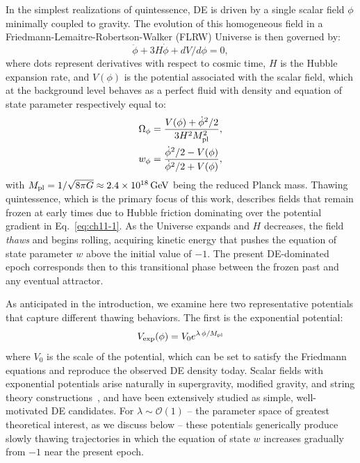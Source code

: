 \noindent In the simplest realizations of quintessence, DE is driven by a single scalar field $\phi$  minimally
coupled to gravity. The evolution of this homogeneous field in a Friedmann-Lemaitre-Robertson-Walker (FLRW) Universe is then governed by:
\begin{equation}
    \ddot{\phi} + 3H\dot{\phi} +
dV/d\phi
= 0, \label{eq:ch11-1}
\end{equation}
where dots represent derivatives with respect to cosmic time, $H$ is the Hubble expansion rate, and $V(\phi)$ is the potential associated with the scalar field, which at the background level behaves as a perfect fluid with density and equation of state parameter respectively equal to:
\begin{align}
    &\Omega_\phi=\frac{V(\phi)+\dot{\phi}^2/2}{3 H^2 M_{\mathrm{pl}}^2},
    \\
    &w_\phi=\frac{\dot{\phi}^2/2-V(\phi)}{\dot{\phi}^2/2+V(\phi)},
\end{align}
with $M_{\mathrm{pl}}=1/\sqrt{8\pi G}\approx 2.4\times 10^{18}\,{\rm GeV}$ being the reduced Planck mass. Thawing quintessence, which is the primary focus of this work, describes fields that remain frozen at early times due to Hubble friction dominating over the potential gradient in Eq.~\eqref{eq:ch11-1}. As the Universe expands and $H$ decreases, the field {\it thaws} and begins rolling, acquiring kinetic energy that pushes the equation of state parameter $w$ above the initial value of $-1$. The present DE-dominated epoch corresponds then to this transitional phase between the frozen past and any eventual attractor.

As anticipated in the introduction, we examine here two representative potentials that capture different thawing behaviors. The first is the exponential potential:
\begin{equation}
    V_{\rm exp}(\phi)
=V_0e^{\lambda\,\phi/M_{\mathrm{pl}}}\label{eq:ch11-exp}
\end{equation}
where $V_0$ is the scale of the potential, which can be set to satisfy the Friedmann equations and reproduce the observed DE density today. Scalar fields with exponential potentials arise naturally in supergravity, modified gravity, and string theory constructions~\cite{Wetterich:1994bg,Binetruy:1998rz,Bedroya:2019snp}, and have been extensively studied as simple, well-motivated DE candidates. For $\lambda \sim \mathcal{O}(1)$ -- the parameter space of greatest theoretical interest, as we discuss below -- these potentials generically produce slowly thawing trajectories in which the equation of state $w$ increases gradually from $-1$ near the present epoch.

